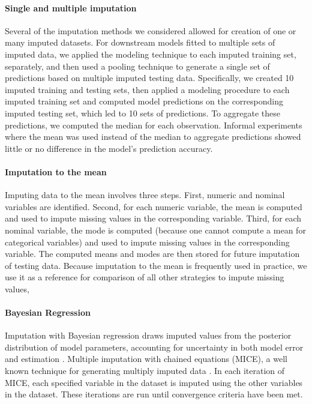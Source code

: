 \documentclass{article}
\begin{document}
\label{subsec:imputation}

\paragraph{Single and multiple imputation}

Several of the imputation methods we considered allowed for creation of
one or many imputed datasets. For downstream models fitted to multiple
sets of imputed data, we applied the modeling technique to each imputed
training set, separately, and then used a pooling technique to generate
a single set of predictions based on multiple imputed testing data.
Specifically, we created 10 imputed training and testing sets, then
applied a modeling procedure to each imputed training set and computed
model predictions on the corresponding imputed testing set, which led to
10 sets of predictions. To aggregate these predictions, we computed the
median for each observation. Informal experiments where the mean was
used instead of the median to aggregate predictions showed little or no
difference in the model's prediction accuracy.

\paragraph{Imputation to the mean}

Imputing data to the mean involves three steps. First, numeric and
nominal variables are identified. Second, for each numeric variable, the
mean is computed and used to impute missing values in the corresponding
variable. Third, for each nominal variable, the mode is computed
(because one cannot compute a mean for categorical variables) and used
to impute missing values in the corresponding variable. The computed
means and modes are then stored for future imputation of testing data.
Because imputation to the mean is frequently used in practice, we use it
as a reference for comparison of all other strategies to impute missing
values,

\paragraph{Bayesian Regression}

Imputation with Bayesian regression draws imputed values from the
posterior distribution of model parameters, accounting for uncertainty
in both model error and estimation \cite{rubin2004multiple}. Multiple
imputation with chained equations (MICE), a well known technique for
generating multiply imputed data
\cite{azur2011multiple, van2018flexible, van2006fully}. In each
iteration of MICE, each specified variable in the dataset is imputed
using the other variables in the dataset. These iterations are run until
convergence criteria have been met.
\end{document}
